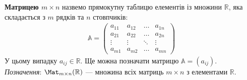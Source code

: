 \documentclass{math_library}
\begin{document}
	\begin{definition}
	\textbf{Матрицею $m \times n$} назвемо прямокутну таблицю елементів із множини $\mathbb{R}$, яка складається з $m$ рядків та $n$ стовпчиків:
	\begin{align*}
	\mathbb{A} = \begin{pmatrix}
	a_{11} & a_{12} & \dots & a_{1n} \\
	a_{21} & a_{22} & \dots & a_{2n} \\
	\vdots & \vdots & \ddots & \vdots \\
	a_{m1} & a_{m2} & \dots & a_{mn}
	\end{pmatrix}
	\end{align*}
	У цьому випадку $a_{ij} \in \mathbb{R}$. Ще можна позначати матрицю $\mathbb{A} = (a_{ij})$.\\
	\textit{Позначення}: $\Mat_{m \times n}(\mathbb{R})$ --- множина всіх матриць $m \times n$ з елементами $\mathbb{R}$.
	\end{definition}
	
\end{document}
